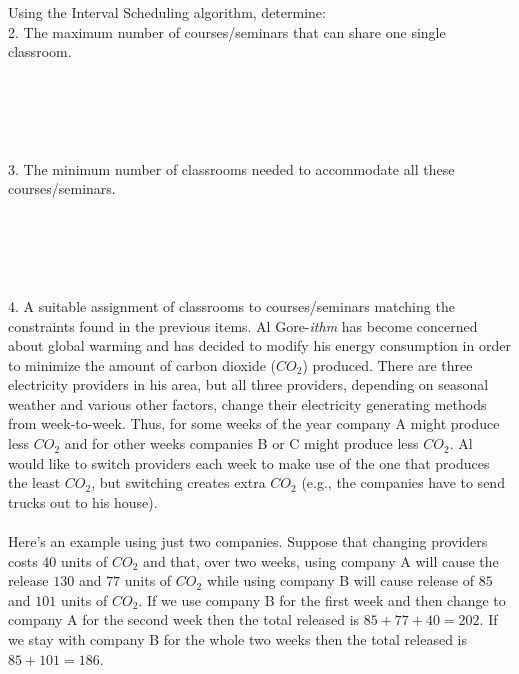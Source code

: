 \documentclass[12pt]{article}
\begin{document}
Using the Interval Scheduling algorithm, determine:\\
2. The maximum number of courses/seminars that can share one single classroom.\\\\\\\\\\\\
3. The minimum number of classrooms needed to accommodate all these courses/seminars. \\\\\\\\\\\\
4. A suitable assignment of classrooms to courses/seminars matching the constraints found in the previous items.
\newpage
Al Gore-\textit{ithm} has become concerned about global warming and has decided to modify his energy consumption in order 
to minimize the amount of carbon dioxide ($CO_2$) produced.  There are three electricity providers in his area, but 
all three providers, depending on seasonal weather and various other factors, change their electricity generating 
methods from week-to-week.  Thus, for some weeks of the year company A might produce less $CO_2$ and for other weeks 
companies B or C might produce less $CO_2$.  Al would like to switch providers each week to make use of the one that 
produces the least $CO_2$, but switching creates extra $CO_2$ (e.g., the companies have to send trucks out to his house).\\\\


Here's an example using just two companies. Suppose that changing providers costs $40$ units of $CO_2$ and that, over two weeks, 
using company A will cause the release $130$ and $77$ units of $CO_2$ while using company B will cause release of $85$ and $101$ units 
of $CO_2$.  If we use company B for the first week and then change to company A for the second week then the total released is 
$85 + 77 + 40 = 202$.  If we stay with company B for the whole two weeks then the total released is $85 + 101 = 186$.\\\\
\end{document}
